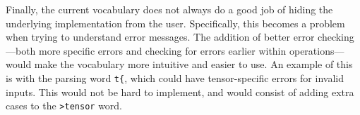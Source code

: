 \documentclass[
]{article}
\begin{document}
Finally, the current vocabulary does not always do a good job of hiding
the underlying implementation from the user. Specifically, this becomes
a problem when trying to understand error messages. The addition of
better error checking---both more specific errors and checking for
errors earlier within operations---would make the vocabulary more
intuitive and easier to use. An example of this is with the parsing word
\texttt{t\{}, which could have tensor-specific errors for invalid
inputs. This would not be hard to implement, and would consist of adding
extra cases to the \texttt{\textgreater{}tensor} word.
\end{document}
